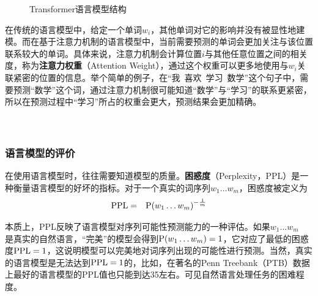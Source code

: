 \begin{figure}[htp]
\centering

\caption{Transformer语言模型结构}
\label{fig:5-63}
\end{figure}

\parinterval  在传统的语言模型中，给定一个单词$ w_i $，其他单词对它的影响并没有被显性地建模。而在基于注意力机制的语言模型中，当前需要预测的单词会更加关注与该位置联系较大的单词。具体来说，注意力机制会计算位置$ i $与其他任意位置之间的相关度，称为{\small\sffamily\bfseries{注意力权重}}（Attention Weight），通过这个权重可以更多地使用与$ w_i $关联紧密的位置的信息。举个简单的例子，在``我\ 喜欢\ 学习\ 数学''这个句子中，需要预测``数学''这个词，通过注意力机制很可能知道``数学''与``学习''的联系更紧密，所以在预测过程中``学习''所占的权重会更大，预测结果会更加精确。\\ \\ \\


\subsubsection{语言模型的评价}

\parinterval  在使用语言模型时，往往需要知道模型的质量。{\small\sffamily\bfseries{困惑度}}（Perplexity，PPL）是一种衡量语言模型的好坏的指标。对于一个真实的词序列$ w_1\dots w_m $，困惑度被定义为
\begin{eqnarray}
{\rm{PPL}}&=&{\rm P}{(w_1\dots w_m)}^{- \frac{1}{m}}
\label{eq:5-65}
\end{eqnarray}

\parinterval  本质上，PPL反映了语言模型对序列可能性预测能力的一种评估。如果$ w_1\dots w_m $\\是真实的自然语言，``完美''的模型会得到$ {\rm P} (w_1\dots w_m)=1 $，它对应了最低的困惑度$ {\rm{PPL}}=1$，这说明模型可以完美地对词序列出现的可能性进行预测。当然，真实的语言模型是无法达到$ {\rm{PPL}}=1$的，比如，在著名的Penn Treebank（PTB）数据上最好的语言模型的PPL值也只能到达35左右。可见自然语言处理任务的困难程度。


